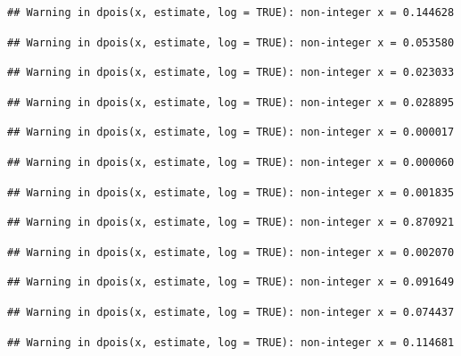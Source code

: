 \documentclass[]{article}
\begin{document}
\begin{verbatim}
## Warning in dpois(x, estimate, log = TRUE): non-integer x = 0.144628
\end{verbatim}

\begin{verbatim}
## Warning in dpois(x, estimate, log = TRUE): non-integer x = 0.053580
\end{verbatim}

\begin{verbatim}
## Warning in dpois(x, estimate, log = TRUE): non-integer x = 0.023033
\end{verbatim}

\begin{verbatim}
## Warning in dpois(x, estimate, log = TRUE): non-integer x = 0.028895
\end{verbatim}

\begin{verbatim}
## Warning in dpois(x, estimate, log = TRUE): non-integer x = 0.000017
\end{verbatim}

\begin{verbatim}
## Warning in dpois(x, estimate, log = TRUE): non-integer x = 0.000060
\end{verbatim}

\begin{verbatim}
## Warning in dpois(x, estimate, log = TRUE): non-integer x = 0.001835
\end{verbatim}

\begin{verbatim}
## Warning in dpois(x, estimate, log = TRUE): non-integer x = 0.870921
\end{verbatim}

\begin{verbatim}
## Warning in dpois(x, estimate, log = TRUE): non-integer x = 0.002070
\end{verbatim}

\begin{verbatim}
## Warning in dpois(x, estimate, log = TRUE): non-integer x = 0.091649
\end{verbatim}

\begin{verbatim}
## Warning in dpois(x, estimate, log = TRUE): non-integer x = 0.074437
\end{verbatim}

\begin{verbatim}
## Warning in dpois(x, estimate, log = TRUE): non-integer x = 0.114681
\end{verbatim}
\end{document}
